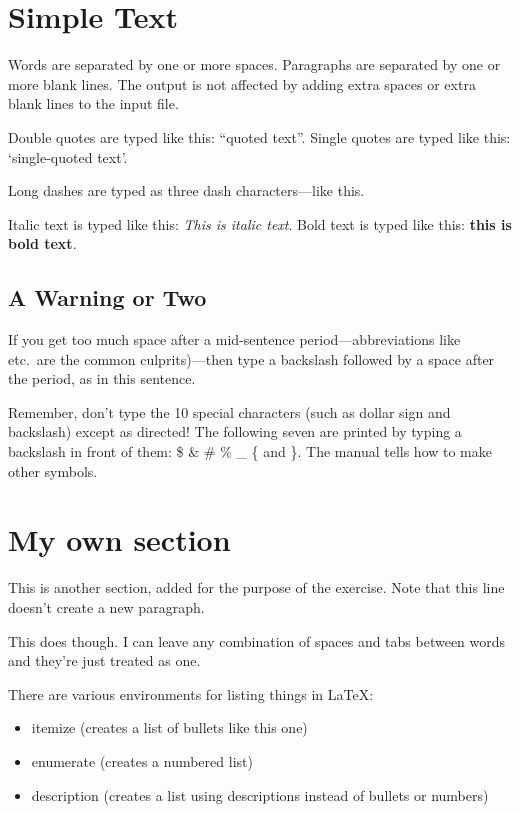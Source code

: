 \documentclass[12pt]{article}  %
\begin{document}
\tableofcontents

\section{Simple Text}          %

Words are separated by one or    more      spaces.  Paragraphs are
    separated by one or more blank lines.  The output is not affected
by adding extra spaces or extra blank lines to the input file.


Double quotes are typed like this: ``quoted text''.
Single quotes are typed like this: `single-quoted text'.

Long dashes are typed as three dash characters---like this.

Italic text is typed like this: \textit{This is italic text}.
Bold   text is typed like this: \textbf{this is  bold  text}.

\subsection{A Warning or Two}        %

If you get too much space after a mid-sentence period---abbreviations
like etc.\ are the common culprits)---then type a backslash followed by
a space after the period, as in this sentence.

Remember, don't type the 10 special characters (such as dollar sign and
backslash) except as directed!  The following seven are printed by
typing a backslash in front of them:  \$  \&  \#  \%  \_  \{  and  \}.
The manual tells how to make other symbols.

\section{My own section}
This is another section, added for the purpose of the exercise.
Note that this line doesn't create a new paragraph.

This does though.	I can leave any  combination of spaces and tabs
between words and they're just treated as one.

There are various environments for listing things in \LaTeX{}:
\begin{itemize}
	\item itemize (creates a list of bullets like this one)
	\item enumerate (creates a numbered list)
	\item description (creates a list using descriptions instead of bullets or numbers)
\end{itemize}
\end{document}

